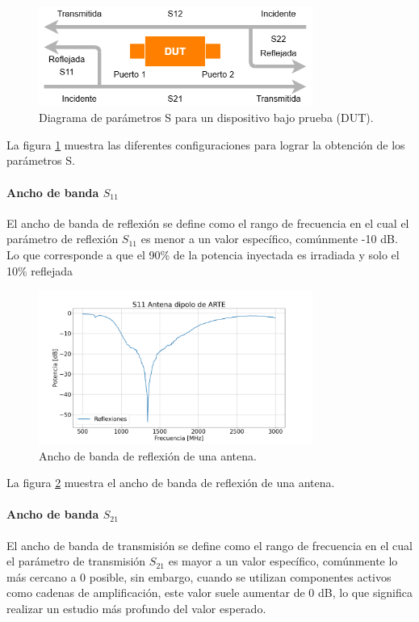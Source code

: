 \begin{figure}
    \centering
    \includegraphics[width = 0.8\textwidth]{img/bloquesS.png}
    \caption{Diagrama de parámetros S para un dispositivo bajo prueba (DUT).}
    \label{fig:sparam}
\end{figure}

La figura \ref{fig:sparam} muestra las diferentes configuraciones para lograr la obtención de los parámetros S.\\

\paragraph{Ancho de banda $S_{11}$} El ancho de banda de reflexión se define como el rango de frecuencia en el cual el parámetro de reflexión $S_{11}$ es menor a un valor específico, comúnmente -10 dB. Lo que corresponde a que el 90\% de la potencia inyectada es irradiada y solo el 10\% reflejada\\

\begin{figure}
    \centering
    \includegraphics[width = 0.8\textwidth]{img/s11Arte}
    \caption{Ancho de banda de reflexión de una antena.}
    \label{fig:bandwidth}
\end{figure}

La figura \ref{fig:bandwidth} muestra el ancho de banda de reflexión de una antena.\\

\paragraph{Ancho de banda $S_{21}$} El ancho de banda de transmisión se define como el rango de frecuencia en el cual el parámetro de transmisión $S_{21}$ es mayor a un valor específico, comúnmente lo más cercano a 0 posible, sin embargo, cuando se utilizan componentes activos como cadenas de amplificación, este valor suele aumentar de 0 dB, lo que significa realizar un estudio más profundo del valor esperado.\\

